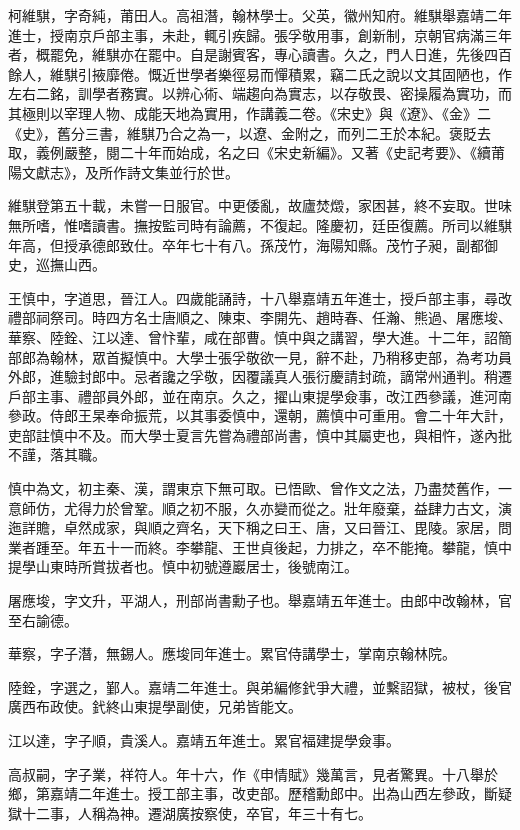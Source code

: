 \begin{pinyinscope}
柯維騏，字奇純，莆田人。高祖潛，翰林學士。父英，徽州知府。維騏舉嘉靖二年進士，授南京戶部主事，未赴，輒引疾歸。張孚敬用事，創新制，京朝官病滿三年者，概罷免，維騏亦在罷中。自是謝賓客，專心讀書。久之，門人日進，先後四百餘人，維騏引掖靡倦。慨近世學者樂徑易而憚積累，竊二氏之說以文其固陋也，作左右二銘，訓學者務實。以辨心術、端趨向為實志，以存敬畏、密操履為實功，而其極則以宰理人物、成能天地為實用，作講義二卷。《宋史》與《遼》、《金》二《史》，舊分三書，維騏乃合之為一，以遼、金附之，而列二王於本紀。褒貶去取，義例嚴整，閱二十年而始成，名之曰《宋史新編》。又著《史記考要》、《續莆陽文獻志》，及所作詩文集並行於世。

維騏登第五十載，未嘗一日服官。中更倭亂，故廬焚燬，家困甚，終不妄取。世味無所嗜，惟嗜讀書。撫按監司時有論薦，不復起。隆慶初，廷臣復薦。所司以維騏年高，但授承德郎致仕。卒年七十有八。孫茂竹，海陽知縣。茂竹子昶，副都御史，巡撫山西。

王慎中，字道思，晉江人。四歲能誦詩，十八舉嘉靖五年進士，授戶部主事，尋改禮部祠祭司。時四方名士唐順之、陳束、李開先、趙時春、任瀚、熊過、屠應埈、華察、陸銓、江以達、曾忭輩，咸在部曹。慎中與之講習，學大進。十二年，詔簡部郎為翰林，眾首擬慎中。大學士張孚敬欲一見，辭不赴，乃稍移吏部，為考功員外郎，進驗封郎中。忌者讒之孚敬，因覆議真人張衍慶請封疏，謫常州通判。稍遷戶部主事、禮部員外郎，並在南京。久之，擢山東提學僉事，改江西參議，進河南參政。侍郎王杲奉命振荒，以其事委慎中，還朝，薦慎中可重用。會二十年大計，吏部註慎中不及。而大學士夏言先嘗為禮部尚書，慎中其屬吏也，與相忤，遂內批不謹，落其職。

慎中為文，初主秦、漢，謂東京下無可取。已悟歐、曾作文之法，乃盡焚舊作，一意師仿，尤得力於曾鞏。順之初不服，久亦變而從之。壯年廢棄，益肆力古文，演迤詳贍，卓然成家，與順之齊名，天下稱之曰王、唐，又曰晉江、毘陵。家居，問業者踵至。年五十一而終。李攀龍、王世貞後起，力排之，卒不能掩。攀龍，慎中提學山東時所賞拔者也。慎中初號遵巖居士，後號南江。

屠應埈，字文升，平湖人，刑部尚書勳子也。舉嘉靖五年進士。由郎中改翰林，官至右諭德。

華察，字子潛，無錫人。應埈同年進士。累官侍講學士，掌南京翰林院。

陸銓，字選之，鄞人。嘉靖二年進士。與弟編修釴爭大禮，並繫詔獄，被杖，後官廣西布政使。釴終山東提學副使，兄弟皆能文。

江以達，字子順，貴溪人。嘉靖五年進士。累官福建提學僉事。

高叔嗣，字子業，祥符人。年十六，作《申情賦》幾萬言，見者驚異。十八舉於鄉，第嘉靖二年進士。授工部主事，改吏部。歷稽勳郎中。出為山西左參政，斷疑獄十二事，人稱為神。遷湖廣按察使，卒官，年三十有七。


\end{pinyinscope}
